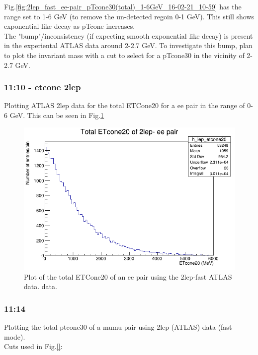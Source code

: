 Fig.\ref{fig:2lep_fast_ee-pair_pTcone30(total)_1-6GeV_16-02-21_10-59} has the range set to 1-6 GeV (to remove the un-detected regoin 0-1 GeV).  This still shows exponential like decay as pTcone increases. \\
The "bump"/inconsistency (if expecting smooth exponential like decay) is present in the experiental ATLAS data around 2-2.7 GeV.  To investigate this bump, plan to plot the invariant mass with a cut to select for a pTcone30 in the vicinity of 2-2.7 GeV.

\subsubsection*{11:10 - etcone 2lep}
Plotting ATLAS 2lep data for the total ETCone20 for a ee pair in the range of 0-6 GeV.  This can be seen in Fig.\ref{fig:2lep_fast_ee-pair_ETcone30(total)_0-6GeV_16-02-21_11-11}

\begin{figure}[h!]
    \centering
	\includegraphics[width=0.85\linewidth]{plots/16-02-2021/2lep_fast_ee-pair_ETcone30(total)_0-6GeV_16-02-21_11-11.png}
	\caption{Plot of the total ETCone20 of an ee pair using the 2lep-fast ATLAS data.  data.}\label{fig:2lep_fast_ee-pair_ETcone30(total)_0-6GeV_16-02-21_11-11}
\end{figure}

\subsubsection*{11:14}
Plotting the total ptcone30 of a mumu pair using 2lep (ATLAS) data (fast mode).
\\
Cuts used in Fig.\ref{}:
\begin{lstlisting}

\end{lstlisting}


